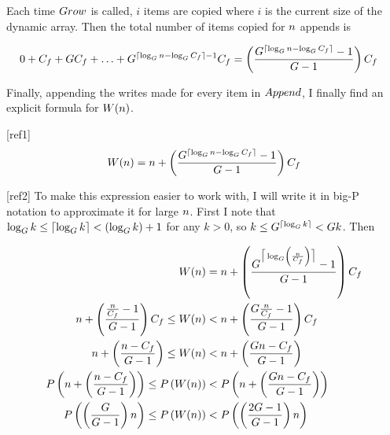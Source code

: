 Each time $Grow$ is called, $i$ items are copied where $i$ is the current size of the dynamic array. Then the total number of items copied for $n$ appends is

\begin{align*}
0 + C_f + GC_f + \ldots + G^{\lceil \log_{G} n - \log_{G} C_f \rceil - 1}C_f &= \left( \frac{G^{\lceil \log_{G} n - \log_{G} C_f \rceil} - 1}{G - 1} \right) C_f
\end{align*}

Finally, appending the writes made for every item in $Append$, I finally find an explicit formula for $W(n)$.

[ref1]
$$
W(n) = n + \left( \frac{G^{\lceil \log_{G} n - \log_{G} C_f \rceil} - 1}{G - 1} \right) C_f
$$

[ref2]
To make this expression easier to work with, I will write it in big-P notation to approximate it for large $n$. First I note that $\log_{G} k \leq \lceil \log_{G} k \rceil < \left( \log_{G} k \right) + 1$ for any $k > 0$, so $k \leq G^{\lceil \log_{G} k \rceil} < G{k}$. Then

\begin{align*}
W(n) &= n + \left( \frac{G^{\big\lceil \log_{G} \left( \frac {n} {C_f} \right) \big\rceil} - 1}{G - 1} \right) C_f\\
n + \left( \frac{\frac{n}{C_f} - 1}{G - 1} \right) C_f \leq W(n) &< n + \left( \frac{G\frac{n}{C_f} - 1}{G - 1} \right) C_f\\
n + \left( \frac{n - C_f}{G - 1} \right) \leq W(n) &< n + \left( \frac{Gn - C_f}{G - 1} \right)\\
P\left( n + \left( \frac{n - C_f}{G - 1} \right) \right) \leq P\left( W(n) \right) &< P\left( n + \left( \frac{Gn - C_f}{G - 1} \right) \right)\\
P\left( \left( \frac{G}{G - 1} \right) n \right) \leq P\left( W(n) \right) &< P\left( \left( \frac{2G - 1}{G - 1} \right) n \right)
\end{align*}

